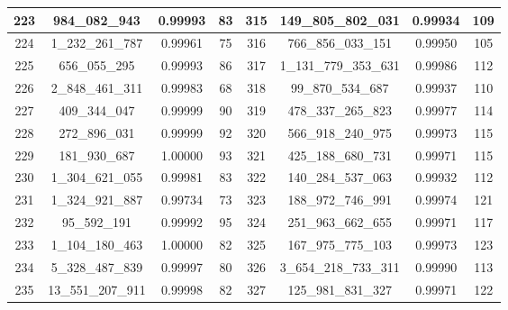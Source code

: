 \documentclass[letterpaper]{article}
\begin{document}
{\begin{tabular}{|c c c c| c c c c|}
        \hline
        223             & 984\_082\_943     & 0.99993          & 83              & 315          & 149\_805\_802\_031    & 0.99934          & 109             \\
        \hline
        224             & 1\_232\_261\_787  & 0.99961          & 75              & 316          & 766\_856\_033\_151    & 0.99950          & 105             \\
        \hline
        225             & 656\_055\_295     & 0.99993          & 86              & 317          & 1\_131\_779\_353\_631 & 0.99986          & 112             \\
        \hline
        226             & 2\_848\_461\_311  & 0.99983          & 68              & 318          & 99\_870\_534\_687     & 0.99937          & 110             \\
        \hline
        227             & 409\_344\_047     & 0.99999          & 90              & 319          & 478\_337\_265\_823    & 0.99977          & 114             \\
        \hline
        228             & 272\_896\_031     & 0.99999          & 92              & 320          & 566\_918\_240\_975    & 0.99973          & 115             \\
        \hline
        229             & 181\_930\_687     & 1.00000          & 93              & 321          & 425\_188\_680\_731    & 0.99971          & 115             \\
        \hline
        230             & 1\_304\_621\_055  & 0.99981          & 83              & 322          & 140\_284\_537\_063    & 0.99932          & 112             \\
        \hline
        231             & 1\_324\_921\_887  & 0.99734          & 73              & 323          & 188\_972\_746\_991    & 0.99974          & 121             \\
        \hline
        232             & 95\_592\_191      & 0.99992          & 95              & 324          & 251\_963\_662\_655    & 0.99971          & 117             \\
        \hline
        233             & 1\_104\_180\_463  & 1.00000          & 82              & 325          & 167\_975\_775\_103    & 0.99973          & 123             \\
        \hline
        234             & 5\_328\_487\_839  & 0.99997          & 80              & 326          & 3\_654\_218\_733\_311 & 0.99990          & 113             \\
        \hline
        235             & 13\_551\_207\_911 & 0.99998          & 82              & 327          & 125\_981\_831\_327    & 0.99971          & 122             \\

\end{tabular}}
\end{document}
